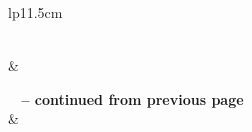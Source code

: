 \newpage
\begin{center}
    \begin{longtable}{lp{11.5cm}}
    \caption{Prompt for action prediction in \model\ with GPT models. Only part of the HTML snippet is shown here to save space. 
    }
    \label{tab:action_prediction_prompt}\\

\toprule {} &  \\ \midrule
\endfirsthead

%
{{\bfseries \tablename\ \thetable{} -- continued from previous page}} \\
\midrule {} &  \\ \midrule 
\endhead

\midrule {} \\ \bottomrule
\endfoot


\end{longtable}
\end{center}
